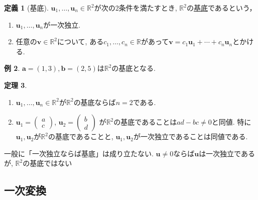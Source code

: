 \documentclass[dvipdfmx,a4paper,11pt]{article}
\newcommand{\R}{\mathbb{R}}
\theoremstyle{definition}
\newtheorem{thm}{定理}
\newtheorem{dfn}[thm]{定義}
\newtheorem{exa}[thm]{例}
\begin{document}
\begin{tcolorbox}[
    colback = white,
    colframe = green!35!black,
    fonttitle = \bfseries,
    breakable = true]
    \begin{dfn}[基底]
  $\bm{u}_1, \ldots, \bm{u}_n \in \R^2 $が次の2条件を満たすとき, $\R^2$の\underline{基底}であるという， 
    \begin{enumerate}
	\setlength{\parskip}{0cm}
  	\setlength{\itemsep}{0pt} 
\item $\bm{u}_1, \ldots, \bm{u}_n $が一次独立.
\item 任意の$\bm{v} \in \R^2$について, ある$c_1, \ldots, c_n \in \R$があって$\bm{v} = c_1\bm{u}_1 + \cdots + c_n\bm{u}_n $とかける.
\end{enumerate}
    \end{dfn}
 \end{tcolorbox}
 
  \begin{exa}
 $\bm{a}=(1,3), \bm{b} = (2,5)$は$\R^2$の基底となる. 
\end{exa}

 
\begin{tcolorbox}[
    colback = white,
    colframe = green!35!black,
    fonttitle = \bfseries,
    breakable = true]
    \begin{thm}
    \begin{enumerate}
	\setlength{\parskip}{0cm}
  	\setlength{\itemsep}{0pt} 
\item   $\bm{u}_1, \ldots, \bm{u}_n \in \R^2 $が$\R^2$の基底ならば$n=2$である. 
\item$\bm{u}_1 =   
\begin{pmatrix}
a \\
 c
 \end{pmatrix} $, 
 $\bm{u}_2 =   
\begin{pmatrix}
b \\
 d
 \end{pmatrix} $
 が$\R^2$の基底であることは$ad-bc \neq 0$と同値. 特に$\bm{u}_1, \bm{u}_2$が$\R^2$の基底であることと, $\bm{u}_1, \bm{u}_2$が一次独立であることは同値である.
\end{enumerate}
    \end{thm}
 \end{tcolorbox}

一般に「一次独立ならば基底」は成り立たない. 
$\bm{u}\neq 0$ならば$\bm{u}$は一次独立であるが, $\R^2$の基底ではない
 
 \subsection{一次変換}
 
\end{document}
